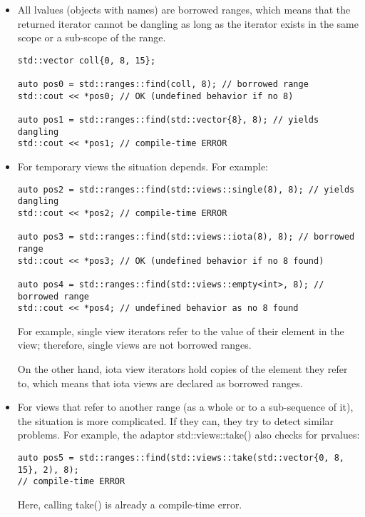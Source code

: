 \begin{itemize}
\item
All lvalues (objects with names) are borrowed ranges, which means that the returned iterator cannot be dangling as long as the iterator exists in the same scope or a sub-scope of the range.

\begin{lstlisting}[style=styleCXX]
std::vector coll{0, 8, 15};

auto pos0 = std::ranges::find(coll, 8); // borrowed range
std::cout << *pos0; // OK (undefined behavior if no 8)

auto pos1 = std::ranges::find(std::vector{8}, 8); // yields dangling
std::cout << *pos1; // compile-time ERROR
\end{lstlisting}

\item
For temporary views the situation depends. For example:

\begin{lstlisting}[style=styleCXX]
auto pos2 = std::ranges::find(std::views::single(8), 8); // yields dangling
std::cout << *pos2; // compile-time ERROR

auto pos3 = std::ranges::find(std::views::iota(8), 8); // borrowed range
std::cout << *pos3; // OK (undefined behavior if no 8 found)

auto pos4 = std::ranges::find(std::views::empty<int>, 8); // borrowed range
std::cout << *pos4; // undefined behavior as no 8 found
\end{lstlisting}

For example, single view iterators refer to the value of their element in the view; therefore, single views are not borrowed ranges.

On the other hand, iota view iterators hold copies of the element they refer to, which means that iota views are declared as borrowed ranges.

\item
For views that refer to another range (as a whole or to a sub-sequence of it), the situation is more complicated. If they can, they try to detect similar problems. For example, the adaptor std::views::take() also checks for prvalues:

\begin{lstlisting}[style=styleCXX]
auto pos5 = std::ranges::find(std::views::take(std::vector{0, 8, 15}, 2), 8);
// compile-time ERROR
\end{lstlisting}

Here, calling take() is already a compile-time error.


\end{itemize}
